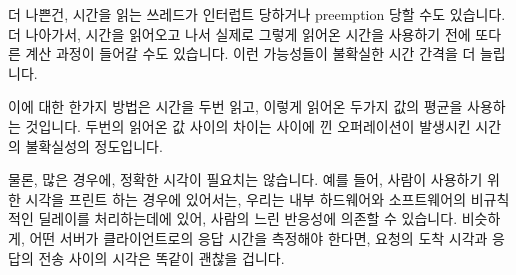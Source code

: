 더 나쁜건, 시간을 읽는 쓰레드가 인터럽트 당하거나 preemption 당할 수도
있습니다.
더 나아가서, 시간을 읽어오고 나서 실제로 그렇게 읽어온 시간을 사용하기 전에
또다른 계산 과정이 들어갈 수도 있습니다.
이런 가능성들이 불확실한 시간 간격을 더 늘립니다.

이에 대한 한가지 방법은 시간을 두번 읽고, 이렇게 읽어온 두가지 값의 평균을
사용하는 것입니다.
두번의 읽어온 값 사이의 차이는 사이에 낀 오퍼레이션이 발생시킨 시간의
불확실성의 정도입니다.

물론, 많은 경우에, 정확한 시각이 필요치는 않습니다.
예를 들어, 사람이 사용하기 위한 시각을 프린트 하는 경우에 있어서는, 우리는 내부
하드웨어와 소프트웨어의 비규칙적인 딜레이를 처리하는데에 있어, 사람의 느린
반응성에 의존할 수 있습니다.
비슷하게, 어떤 서버가 클라이언트로의 응답 시간을 측정해야 한다면, 요청의 도착
시각과 응답의 전송 사이의 시각은 똑같이 괜찮을 겁니다.

